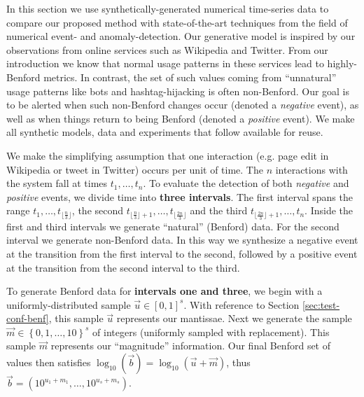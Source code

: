 \documentclass[twoside,leqno,twocolumn]{article}\usepackage[]{graphicx}\usepackage[]{color}
\begin{document}
In this section we use synthetically-generated numerical time-series data to compare our proposed method with state-of-the-art techniques from the field of numerical event- and anomaly-detection. Our generative model is inspired by our observations from online services such as Wikipedia and Twitter. From our introduction we know that normal usage patterns in these services lead to highly-Benford metrics. In contrast, the set of such values coming from ``unnatural'' usage patterns like bots and hashtag-hijacking is often non-Benford. Our goal is to be alerted when such non-Benford changes occur (denoted a \textit{negative} event), as well as when things return to being Benford (denoted a \textit{positive} event). We make all synthetic models, data and experiments that follow available for reuse\footnotemark[\ref{supMatFootnote}].

We make the simplifying assumption that one interaction (e.g. page edit in Wikipedia or tweet in Twitter) occurs per unit of time. The $n$ interactions with the system fall at times $t_1, \ldots, t_n$. To evaluate the detection of both \textit{negative} and \textit{positive} events, we divide time into \textbf{three intervals}. The first interval spans the range $t_1,\ldots,t_{\lfloor\frac{n}{3}\rfloor}$, the second $t_{\lfloor\frac{n}{3}\rfloor + 1},\ldots,t_{\lfloor\frac{2n}{3}\rfloor}$ and the third $t_{\lfloor\frac{2n}{3}\rfloor + 1},\ldots,t_n$. Inside the first and third intervals we generate ``natural'' (Benford) data. For the second interval we generate non-Benford data. In this way we synthesize a negative event at the transition from the first interval to the second, followed by a positive event at the transition from the second interval to the third.


To generate Benford data for \textbf{intervals one and three}, we begin with a uniformly-distributed sample $\vec{u} \in [0,1]^s$. With reference to Section \ref{sec:test-conf-benf}, this sample $\vec{u}$ represents our mantissae. Next we generate the sample $\vec{m} \in \left\{0,1,\ldots, 10\right\}^s$ of integers (uniformly sampled with replacement). This sample $\vec{m}$ represents our ``magnitude'' information. Our final Benford set of values then satisfies $\log_{10}(\vec{b}) = \log_{10}(\vec{u} + \vec{m})$, thus $\vec{b} = \left(10^{u_1+m_1}, \ldots, 10^{u_s+m_s} \right)$.
\end{document}
